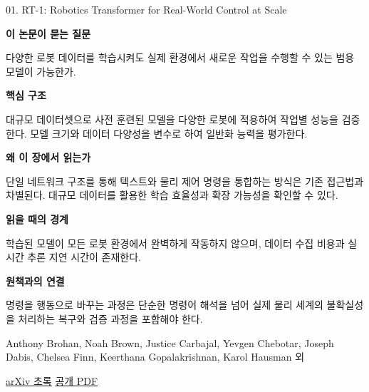 \documentclass[11pt,openany]{book}
\begin{document}
\begin{termcard}{01. RT-1: Robotics Transformer for Real-World Control at Scale}

\par

\medskip

{\sffamily\bfseries\color{deepblue} 이 논문이 묻는 질문}\par

다양한 로봇 데이터를 학습시켜도 실제 환경에서 새로운 작업을 수행할 수 있는 범용 모델이 가능한가.

\smallskip

{\sffamily\bfseries\color{deepblue} 핵심 구조}\par

대규모 데이터셋으로 사전 훈련된 모델을 다양한 로봇에 적용하여 작업별 성능을 검증한다. 모델 크기와 데이터 다양성을 변수로 하여 일반화 능력을 평가한다.

\smallskip

{\sffamily\bfseries\color{deepblue} 왜 이 장에서 읽는가}\par

단일 네트워크 구조를 통해 텍스트와 물리 제어 명령을 통합하는 방식은 기존 접근법과 차별된다. 대규모 데이터를 활용한 학습 효율성과 확장 가능성을 확인할 수 있다.

\smallskip

{\sffamily\bfseries\color{coral} 읽을 때의 경계}\par

학습된 모델이 모든 로봇 환경에서 완벽하게 작동하지 않으며, 데이터 수집 비용과 실시간 추론 지연 시간이 존재한다.

\smallskip

{\sffamily\bfseries\color{teal} 원책과의 연결}\par

명령을 행동으로 바꾸는 과정은 단순한 명령어 해석을 넘어 실제 물리 세계의 불확실성을 처리하는 복구와 검증 과정을 포함해야 한다.

\medskip

{\footnotesize\color{muted} Anthony Brohan, Noah Brown, Justice Carbajal, Yevgen Chebotar, Joseph Dabis, Chelsea Finn, Keerthana Gopalakrishnan, Karol Hausman 외\par

\href{https://arxiv.org/abs/2212.06817}{arXiv 초록} \quad \href{https://arxiv.org/pdf/2212.06817}{공개 PDF}\par}

\end{termcard}
\end{document}
